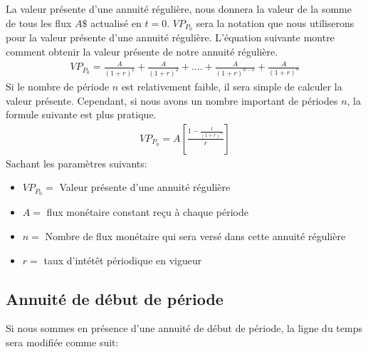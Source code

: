 \documentclass[12pt]{article}
\begin{document}
La valeur présente d'une annuité régulière, nous donnera la valeur de la somme de tous les flux $A\$$ actualisé en $t=0$. $VP_{P_0}$ sera la notation que nous utiliserons pour la valeur présente d'une annuité régulière. L'équation suivante montre comment obtenir la valeur présente de notre annuité régulière.  
\begin{align*}
VP_{P_0} = \frac{A}{(1+r)^{1}}+\frac{A}{(1+r)^{2}}+....+\frac{A}{(1+r)^{n-1}}+\frac{A}{(1+r)^{n}}
\end{align*}
Si le nombre de période $n$ est relativement faible, il sera simple de calculer la valeur présente. Cependant, si nous avons un nombre important de périodes $n$, la formule suivante est plus pratique. 
\begin{align*}
VP_{P_0}=A \left[ \frac{1-\frac{1}{(1+r)^n}}{r} \right]
\end{align*}
Sachant les paramètres suivants: 
\begin{itemize}
\item $VP_{P_0}=$ Valeur présente d'une annuité régulière 
\item $A=$ flux monétaire constant reçu à chaque période  
\item $n=$ Nombre de flux monétaire qui sera versé dans cette annuité régulière
\item $r=$ taux d'intétêt périodique en vigueur 
\end{itemize}

\subsection{Annuité de début de période}
Si nous sommes en présence d'une annuité de début de période, la ligne du temps sera modifiée comme suit: \\

  
\end{document}
